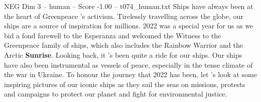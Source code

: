 \begin{textsample}{NEG Dim 3 – human – Score -1.00 – t074\_human.txt}  \label{ex:f3_neg_042}
Ships have always been at the heart of Greenpeace ’s activism.
Tirelessly travelling across the globe, our ships are a source of inspiration for millions. 2022 was a special year for us as we bid a fond farewell to the Esperanza and welcomed the Witness to the Greenpeace family of ships, which also includes the Rainbow Warrior and the Arctic \textbf{Sunrise}.
Looking back, it ’s been quite a ride for our ships.
Our ships have also been instrumental as vessels of peace, especially in the tense climate of the war in Ukraine.
To honour the journey that 2022 has been, let ’s look at some inspiring pictures of our iconic ships as they sail the seas on missions, protests and campaigns to protect our planet and fight for environmental justice.

\end{textsample}
